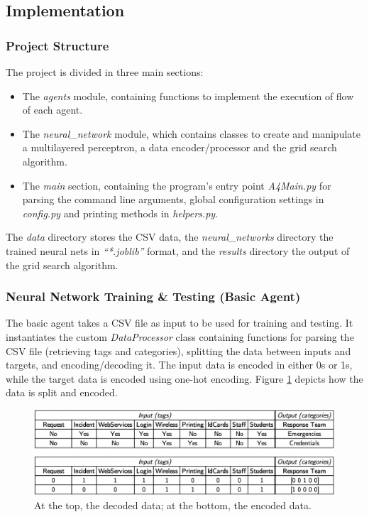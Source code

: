 \documentclass[letterpaper,12pt]{article}
\begin{document}

\subsection{Implementation}

\subsubsection{Project Structure}

The project is divided in three main sections:

\begin{itemize}
    \item The \textit{agents} module, containing functions to implement the execution of flow of each agent.
    \item The \textit{neural\_network} module, which contains classes to create and manipulate a multilayered perceptron, a data encoder/processor and the grid search algorithm.
    \item The \textit{main} section, containing the program's entry point \textit{A4Main.py} for parsing the command line arguments, global configuration settings in \textit{config.py} and printing methods in \textit{helpers.py}.
\end{itemize}

The \textit{data} directory stores the CSV data, the \textit{neural\_networks} directory the trained neural nets in \textit{``*.joblib''} format, and the \textit{results} directory the output of the grid search algorithm.


\subsubsection{Neural Network Training \& Testing (Basic Agent)}
\label{sec:basic-agent}

The basic agent takes a CSV file as input to be used for training and testing. It instantiates the custom \textit{DataProcessor} class containing functions for parsing the CSV file (retrieving tags and categories), splitting the data between inputs and targets, and encoding/decoding it. The input data is encoded in either 0s or 1s, while the target data is encoded using one-hot encoding. Figure \ref{fig:data_encoding} depicts how the data is split and encoded.

\begin{figure}[h] 
\centerline{\includegraphics[width=\textwidth]{report/figures/data_encoding.png}}
\caption{\label{fig:data_encoding}At the top, the decoded data; at the bottom, the encoded data.}
\end{figure}
\end{document}
